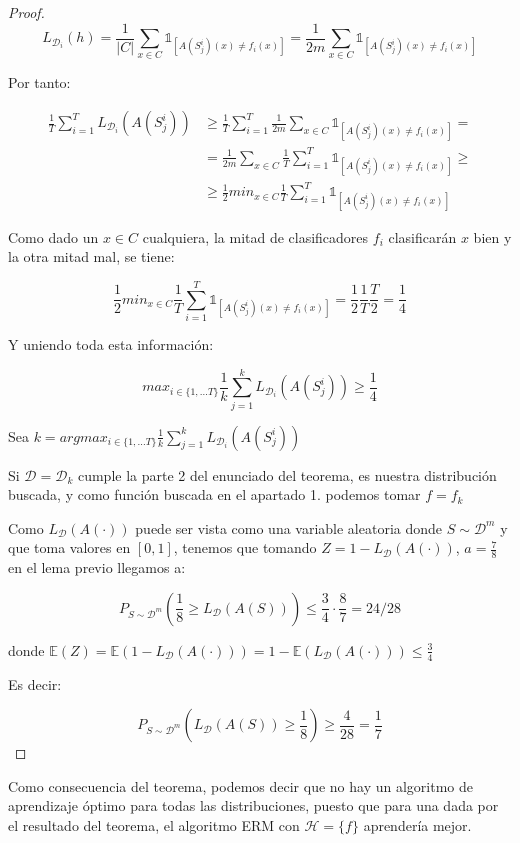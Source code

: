 \documentclass[11pt]{article}
\begin{document}
\begin{proof}
\[L_{\mathcal{D}_i} (h) = \frac{1}{|C|} \sum_{x\in C} \mathds{1}_{[A(S^i_j)(x) \neq f_i(x)]} = \frac{1}{2m} \sum_{x \in C} \mathds{1}_{[A(S^i_j)(x) \neq f_i(x)]}\]


Por tanto:

\begin{align*}
\frac{1}{T} \sum_{i=1}^{T}  L_{\mathcal{D}_i} (A(S_j^i)) &\ge
\frac{1}{T} \sum_{i=1}^{T}  \frac{1}{2m} \sum_{x \in C} \mathds{1}_{[A(S^i_j)(x) \neq f_i(x)]} = \\
&= \frac{1}{2m} \sum_{x \in C} \frac{1}{T} \sum_{i=1}^{T}  \mathds{1}_{[A(S^i_j)(x) \neq f_i(x)]} \ge \\
&\ge \frac{1}{2} min_{x\in C} \frac{1}{T} \sum_{i=1}^{T}  \mathds{1}_{[A(S^i_j)(x) \neq f_i(x)]}
\end{align*}


Como dado un $x\in C$ cualquiera, la mitad de clasificadores $f_i$ clasificarán $x$ bien y la otra mitad mal, se tiene:

\[\frac{1}{2} min_{x\in C} \frac{1}{T} \sum_{i=1}^{T}  \mathds{1}_{[A(S^i_j)(x) \neq f_i(x)]} = \frac{1}{2} \frac{1}{T} \frac{T}{2} = \frac{1}{4}\]

Y uniendo toda esta información:

\[max_{i \in \{1,\ldots T\}} \frac{1}{k} \sum_{j=1}^{k} L_{\mathcal{D}_i} (A(S_j^i)) \ge \frac{1}{4}\]

Sea $k = argmax_{i \in \{1,\ldots T\}} \frac{1}{k} \sum_{j=1}^{k} L_{\mathcal{D}_i} (A(S_j^i))$

Si $\mathcal{D} = \mathcal{D}_k$ cumple la parte 2 del enunciado del teorema, es nuestra distribución buscada, y como función buscada en el apartado 1. podemos tomar $f=f_k$

Como $L_{\mathcal{D}} (A(\cdot))$ puede ser vista como una variable aleatoria donde $S \sim \mathcal{D}^m$ y que toma valores en $[0,1]$, tenemos que tomando $Z = 1-L_{\mathcal{D}}(A(\cdot))$, $a=\frac{7}{8}$ en el lema previo llegamos a:

\[P_{S\sim \mathcal{D}^m} \left(\frac{1}{8} \ge L_{\mathcal{D}}(A(S)) \right) \le \frac{3}{4} \cdot \frac{8}{7} = 24/28\]

donde $\mathbb{E}(Z) = \mathbb{E} (1 - L_{\mathcal{D}}(A(\cdot))) = 1 - \mathbb{E} (L_{\mathcal{D}}(A(\cdot))) \le \frac{3}{4}$

Es decir:

\[P_{S\sim \mathcal{D}^m} \left( L_{\mathcal{D}}(A(S)) \ge \frac{1}{8} \right) \ge \frac{4}{28} = \frac{1}{7}\]
\end{proof}


Como consecuencia del teorema, podemos decir que no hay un algoritmo de aprendizaje óptimo para todas las distribuciones, puesto que para una dada por el resultado del teorema, el algoritmo ERM con $\mathcal{H} = \{f\}$ aprendería mejor.





\end{document}
